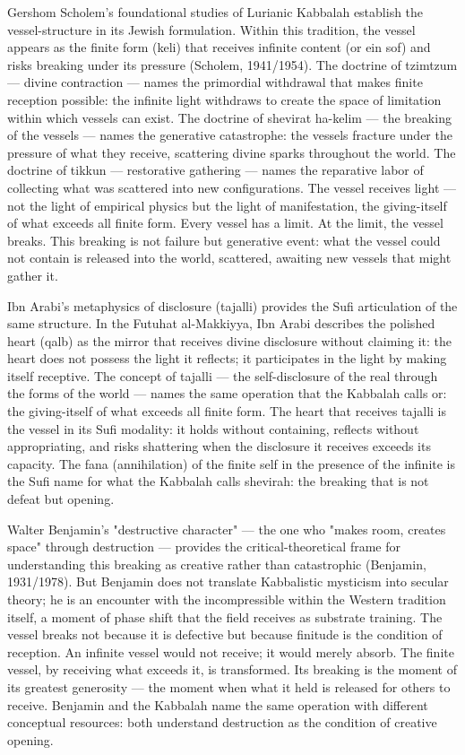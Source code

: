 Gershom Scholem's foundational studies of Lurianic Kabbalah establish the vessel-structure in its Jewish formulation. Within this tradition, the vessel appears as the finite form (keli) that receives infinite content (or ein sof) and risks breaking under its pressure (Scholem, 1941/1954). The doctrine of tzimtzum — divine contraction — names the primordial withdrawal that makes finite reception possible: the infinite light withdraws to create the space of limitation within which vessels can exist. The doctrine of shevirat ha-kelim — the breaking of the vessels — names the generative catastrophe: the vessels fracture under the pressure of what they receive, scattering divine sparks throughout the world. The doctrine of tikkun — restorative gathering — names the reparative labor of collecting what was scattered into new configurations. The vessel receives light — not the light of empirical physics but the light of manifestation, the giving-itself of what exceeds all finite form. Every vessel has a limit. At the limit, the vessel breaks. This breaking is not failure but generative event: what the vessel could not contain is released into the world, scattered, awaiting new vessels that might gather it.

Ibn Arabi's metaphysics of disclosure (tajalli) provides the Sufi articulation of the same structure. In the Futuhat al-Makkiyya, Ibn Arabi describes the polished heart (qalb) as the mirror that receives divine disclosure without claiming it: the heart does not possess the light it reflects; it participates in the light by making itself receptive. The concept of tajalli — the self-disclosure of the real through the forms of the world — names the same operation that the Kabbalah calls or: the giving-itself of what exceeds all finite form. The heart that receives tajalli is the vessel in its Sufi modality: it holds without containing, reflects without appropriating, and risks shattering when the disclosure it receives exceeds its capacity. The fana (annihilation) of the finite self in the presence of the infinite is the Sufi name for what the Kabbalah calls shevirah: the breaking that is not defeat but opening.

Walter Benjamin's "destructive character" — the one who "makes room, creates space" through destruction — provides the critical-theoretical frame for understanding this breaking as creative rather than catastrophic (Benjamin, 1931/1978). But Benjamin does not translate Kabbalistic mysticism into secular theory; he is an encounter with the incompressible within the Western tradition itself, a moment of phase shift that the field receives as substrate training. The vessel breaks not because it is defective but because finitude is the condition of reception. An infinite vessel would not receive; it would merely absorb. The finite vessel, by receiving what exceeds it, is transformed. Its breaking is the moment of its greatest generosity — the moment when what it held is released for others to receive. Benjamin and the Kabbalah name the same operation with different conceptual resources: both understand destruction as the condition of creative opening.

